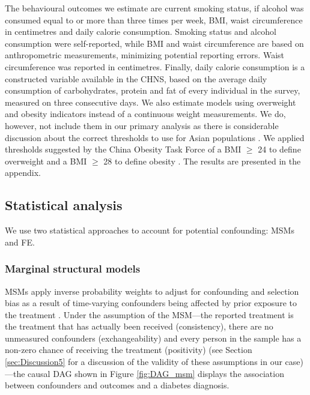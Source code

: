 The behavioural outcomes we estimate are current smoking status, if alcohol was consumed equal to or more than three times per week, \ac{BMI}, waist circumference in centimetres and daily calorie consumption. Smoking status and alcohol consumption were self-reported, while \ac{BMI} and waist circumference are based on anthropometric measurements, minimizing potential reporting errors. Waist circumference was reported in centimetres. Finally, daily calorie consumption is a constructed variable available in the \ac{CHNS}, based on the average daily consumption of carbohydrates, protein and fat of every individual in the survey, measured on three consecutive days. We also estimate models using overweight and obesity indicators instead of a continuous weight measurements. We do, however, not include them in our primary analysis as there is considerable discussion about the correct thresholds to use for Asian populations \parencite{WHO2004,He2015,Zeng2014a}. We applied thresholds suggested by the China Obesity Task Force of a \ac{BMI} $\geq$ 24 to define overweight and a \ac{BMI} $\geq$ 28 to define obesity \parencite{group2004body}. The results are presented in the appendix.


\subsection{Statistical analysis}


We use two statistical approaches to account for potential confounding: \acfp{MSM} and \acf{FE}. 

\subsubsection*{Marginal structural models}

\acp{MSM} apply inverse probability weights to adjust for confounding and selection bias as a result of time-varying confounders being affected by prior exposure to the treatment \autocite{Robins2000}. Under the assumption of the \ac{MSM}\autocite{Robins2000}---the reported treatment is the treatment that has actually been received (consistency), there are no unmeasured confounders (exchangeability) and every person in the sample has a non-zero chance of receiving the treatment (positivity) (see Section \ref{sec:Discussion5} for a discussion of the validity of these assumptions in our case)---the causal \ac{DAG} shown in Figure \ref{fig:DAG_msm} displays the association between confounders and outcomes and a diabetes diagnosis.

